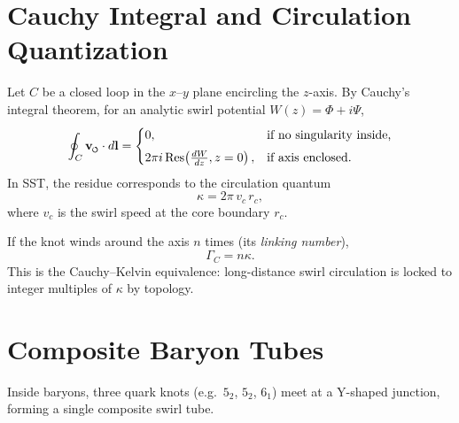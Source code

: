 \documentclass[reprint,aps,onecolumn,nofootinbib]{revtex4-2}
\newcommand{\swirlarrow}{%
    \mathchoice{\mkern-2mu\scriptstyle\boldsymbol{\circlearrowleft}}%
    {\mkern-2mu\scriptstyle\boldsymbol{\circlearrowleft}}%
    {\mkern-2mu\scriptscriptstyle\boldsymbol{\circlearrowleft}}%
    {\mkern-2mu\scriptscriptstyle\boldsymbol{\circlearrowleft}}%
}
\newcommand{\vswirl}{\mathbf{v}_{\swirlarrow}}
\newcommand{\GammaC}{\Gamma_C}
\begin{document}
\section{Cauchy Integral and Circulation Quantization}
    Let $C$ be a closed loop in the $x$--$y$ plane encircling the $z$-axis.
    By Cauchy's integral theorem, for an analytic swirl potential $W(z)=\Phi+i\Psi$,
    \begin{equation}
    \oint_C \vswirl \cdot d\mathbf{l} =
    \begin{cases}
    0, & \text{if no singularity inside,}\\[4pt]
    2\pi i\, \mathrm{Res}\!\left(\frac{dW}{dz}, z=0\right), & \text{if axis enclosed.}
    \end{cases}
    \end{equation}
    In SST, the residue corresponds to the circulation quantum
    \begin{equation}
    \kappa = 2\pi\, v_c\, r_c,
    \end{equation}
    where $v_c$ is the swirl speed at the core boundary $r_c$.

    If the knot winds around the axis $n$ times (its \emph{linking number}),
    \begin{equation}
    \GammaC = n \kappa.
    \end{equation}
    This is the Cauchy--Kelvin equivalence: long-distance swirl circulation is locked to integer multiples of $\kappa$ by topology.

\section{Composite Baryon Tubes}
    Inside baryons, three quark knots (e.g.\ $5_2$, $5_2$, $6_1$) meet at a Y-shaped junction, forming a single composite swirl tube.
\end{document}
